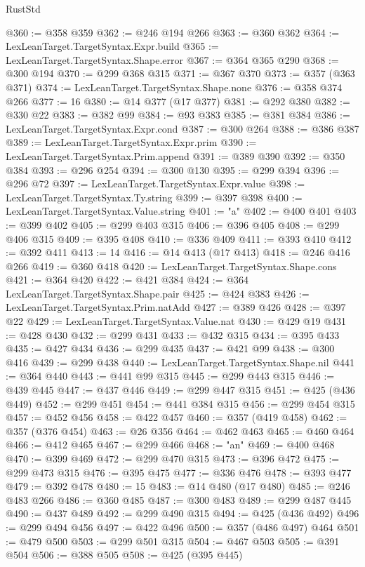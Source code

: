 \begin{lexlean}{RustStd}
\begin{coremodule}
@360 := @358 @359
@362 := @246 @194 @266
@363 := @360 @362
@364 := LexLeanTarget.TargetSyntax.Expr.build
@365 := LexLeanTarget.TargetSyntax.Shape.error
@367 := @364 @365 @290
@368 := @300 @194
@370 := @299 @368 @315
@371 := @367 @370
@373 := @357 (@363 @371)
@374 := LexLeanTarget.TargetSyntax.Shape.none
@376 := @358 @374 @266
@377 := 16
@380 := @14 @377 (@17 @377)
@381 := @292 @380
@382 := @330 @22
@383 := @382 @99
@384 := @93 @383
@385 := @381 @384
@386 := LexLeanTarget.TargetSyntax.Expr.cond
@387 := @300 @264
@388 := @386 @387
@389 := LexLeanTarget.TargetSyntax.Expr.prim
@390 := LexLeanTarget.TargetSyntax.Prim.append
@391 := @389 @390
@392 := @350 @384
@393 := @296 @254
@394 := @300 @130
@395 := @299 @394
@396 := @296 @72
@397 := LexLeanTarget.TargetSyntax.Expr.value
@398 := LexLeanTarget.TargetSyntax.Ty.string
@399 := @397 @398
@400 := LexLeanTarget.TargetSyntax.Value.string
@401 := "a"
@402 := @400 @401
@403 := @399 @402
@405 := @299 @403 @315
@406 := @396 @405
@408 := @299 @406 @315
@409 := @395 @408
@410 := @336 @409
@411 := @393 @410
@412 := @392 @411
@413 := 14
@416 := @14 @413 (@17 @413)
@418 := @246 @416 @266
@419 := @360 @418
@420 := LexLeanTarget.TargetSyntax.Shape.cons
@421 := @364 @420
@422 := @421 @384
@424 := @364 LexLeanTarget.TargetSyntax.Shape.pair
@425 := @424 @383
@426 := LexLeanTarget.TargetSyntax.Prim.natAdd
@427 := @389 @426
@428 := @397 @22
@429 := LexLeanTarget.TargetSyntax.Value.nat
@430 := @429 @19
@431 := @428 @430
@432 := @299 @431
@433 := @432 @315
@434 := @395 @433
@435 := @427 @434
@436 := @299 @435
@437 := @421 @99
@438 := @300 @416
@439 := @299 @438
@440 := LexLeanTarget.TargetSyntax.Shape.nil
@441 := @364 @440
@443 := @441 @99 @315
@445 := @299 @443 @315
@446 := @439 @445
@447 := @437 @446
@449 := @299 @447 @315
@451 := @425 (@436 @449)
@452 := @299 @451
@454 := @441 @384 @315
@456 := @299 @454 @315
@457 := @452 @456
@458 := @422 @457
@460 := @357 (@419 @458)
@462 := @357 (@376 @454)
@463 := @26 @356
@464 := @462 @463
@465 := @460 @464
@466 := @412 @465
@467 := @299 @466
@468 := "an"
@469 := @400 @468
@470 := @399 @469
@472 := @299 @470 @315
@473 := @396 @472
@475 := @299 @473 @315
@476 := @395 @475
@477 := @336 @476
@478 := @393 @477
@479 := @392 @478
@480 := 15
@483 := @14 @480 (@17 @480)
@485 := @246 @483 @266
@486 := @360 @485
@487 := @300 @483
@489 := @299 @487 @445
@490 := @437 @489
@492 := @299 @490 @315
@494 := @425 (@436 @492)
@496 := @299 @494 @456
@497 := @422 @496
@500 := @357 (@486 @497) @464
@501 := @479 @500
@503 := @299 @501 @315
@504 := @467 @503
@505 := @391 @504
@506 := @388 @505
@508 := @425 (@395 @445)

\end{coremodule}
\end{lexlean}
